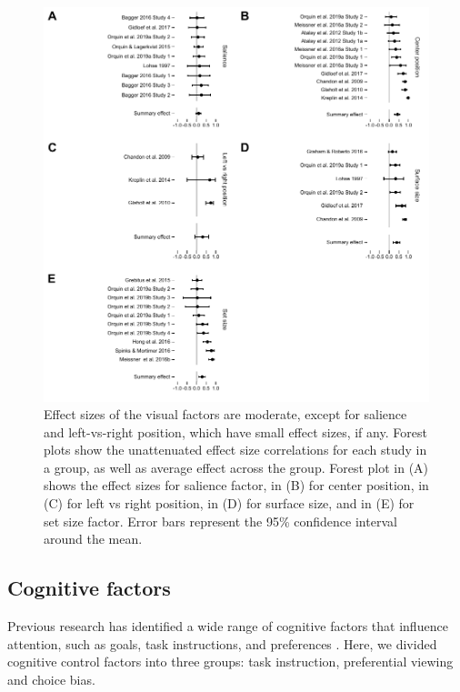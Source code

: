 \documentclass[english,natbib,man,floatsintext]{apa6}
\begin{document}
\begin{figure}[h]
\includegraphics{forest_plots_visual}
\centering
\caption{Effect sizes of the visual factors are moderate, except for salience and left-vs-right position, which have small effect sizes, if any. Forest plots show the unattenuated effect size correlations for each study in a group, as well as average effect across the group. Forest plot in (A) shows the effect sizes for salience factor, in (B) for center position, in (C) for left vs right position, in  (D) for surface size, and in (E) for set size factor. Error bars represent the 95\% confidence interval around the mean.}
\label{fig:forest_plots_visual}
\end{figure}


\subsection{Cognitive factors}

Previous research has identified a wide range of cognitive factors that influence attention, such as goals, task instructions, and preferences \citep[for a review see][]{orquin2013a}. Here, we divided cognitive control factors into three groups: task instruction, preferential viewing and choice bias. 
\end{document}
